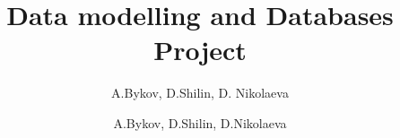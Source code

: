 \documentclass[12pt,a4paper]{article}
\author{A.Bykov, D.Shilin, D. Nikolaeva}
\begin{document}
\newcommand{\happysmile}[1]{
\begin{tikzpicture}[scale=#1/10]
  \fill[yellow] (0,0) circle (2);
  \draw (0.75,0.5) circle (0.25);
  \draw (-0.75,0.5) circle (0.25);
  \draw (1,-0.5)..controls(0,-1.5)..(-1,-0.5);
\end{tikzpicture}
}
\newcommand{\sadsmile}[1]{
\begin{tikzpicture}[scale=#1/10]
  \fill[yellow] (0,0) circle (2);
  \draw (0.75,0.5) circle (0.25);
  \draw (-0.75,0.5) circle (0.25);
  \draw (1,-1)..controls(0,-0.5)..(-1,-1);
\end{tikzpicture}
}

\newcommand{\newtitle}[2]{
\title{#1}
\author{#2}
\maketitle
\pagebreak
\tableofcontents
\pagebreak
}
\newcommand{\definition}[2]{
\underline{\textit{#1}}- #2
}
\newcommand{\code}[2]{

}
\newtitle{Data modelling and Databases \\ [2ex] Project}{A.Bykov, D.Shilin, D.Nikolaeva}
\end{document}
